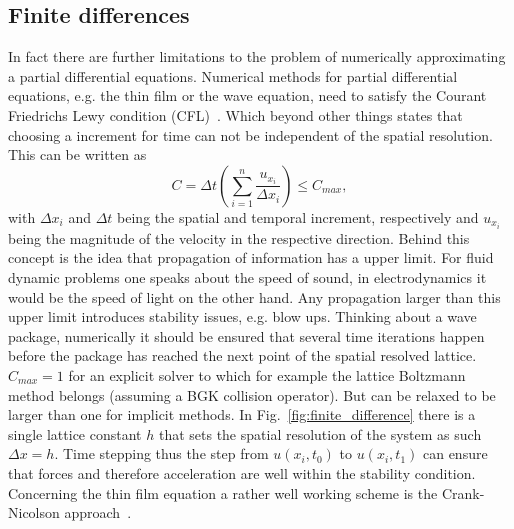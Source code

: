 \subsection{Finite differences}
In fact there are further limitations to the problem of numerically approximating a partial differential equations.
Numerical methods for partial differential equations, e.g. the thin film or the wave equation, need to satisfy the Courant Friedrichs Lewy condition (CFL)~\cite{courant1928partiellen}.  
Which beyond other things states that choosing a increment for time can not be independent of the spatial resolution.
This can be written as
\begin{equation}\label{eq:CFL}
    C = \Delta t \left(\sum_{i=1}^n \frac{u_{x_i}}{\Delta x_i}\right) \leq C_{max},
\end{equation}
with $\Delta x_i$ and $\Delta t$ being the spatial and temporal increment, respectively and $u_{x_i}$ being the magnitude of the velocity in the respective direction.
Behind this concept is the idea that propagation of information has a upper limit.
For fluid dynamic problems one speaks about the speed of sound, in electrodynamics it would be the speed of light on the other hand.
Any propagation larger than this upper limit introduces stability issues, e.g. blow ups.
Thinking about a wave package, numerically it should be ensured that several time iterations happen before the package has reached the next point of the spatial resolved lattice.
$C_{max} = 1$ for an explicit solver to which for example the lattice Boltzmann method belongs (assuming a BGK collision operator).
But can be relaxed to be larger than one for implicit methods.
In Fig.~\ref{fig:finite_difference} there is a single lattice constant $h$ that sets the spatial resolution of the system as such $\Delta x = h$.
Time stepping thus the step from $u(x_i,t_0)$ to $u(x_i,t_1)$ can ensure that forces and therefore acceleration are well within the stability condition.
Concerning the thin film equation a rather well working scheme is the Crank-Nicolson approach~\cite{crank_nicolson_1947, PhysRevE.63.011208, 10.5555/1403886}.

